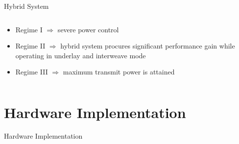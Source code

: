 \documentclass[16pt]{beamer}
\begin{document}
\begin{frame}[t]{Hybrid System}
\begin{columns}
\begin{column}{0.55\columnwidth}
\begin{center}
{{
			}
                }
		\end{center}
		\vspace{-1mm}
		\begin{block}{}
			\begin{itemize}
				\item Regime I  $\Rightarrow$ severe power control
				\item Regime II $\Rightarrow$ hybrid system procures significant performance gain while operating in underlay and interweave mode
				\item Regime III $\Rightarrow$ maximum transmit power is attained 
			\end{itemize}	
		\end{block}
		\end{column}
	\end{columns}
\end{frame}




\section{Hardware Implementation}
\begin{frame}[c]{}
\begin{center}
Hardware Implementation
\end{center}
\end{frame}
\end{document}
